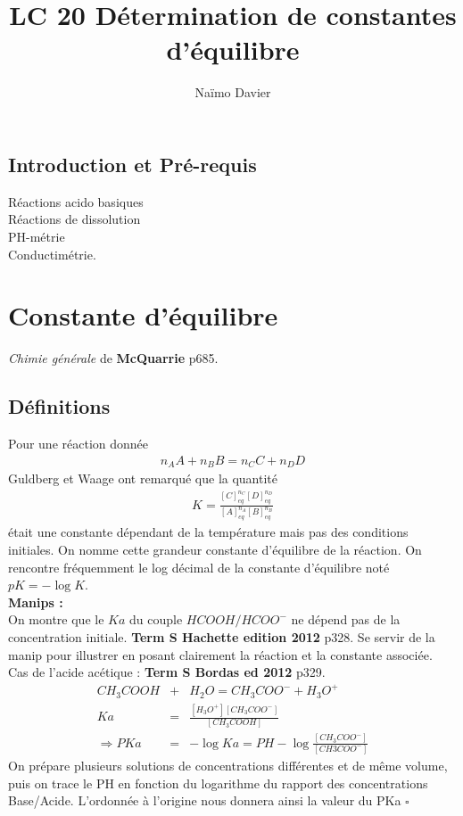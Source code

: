 \documentclass[12pt,prb,aps,epsf]{article}
\begin{document}
	
	\title{LC 20 Détermination de constantes d'équilibre}
		\author{Naïmo Davier}
	
	\maketitle
	
	\tableofcontents
	
	\pagebreak
	
\subsection{Introduction et Pré-requis}
Réactions acido basiques\\
Réactions de dissolution\\
PH-métrie\\
Conductimétrie.

\section{Constante d'équilibre}
\textit{Chimie générale} de \textbf{McQuarrie} p685.

\subsection{Définitions}
Pour une réaction donnée
\begin{eqnarray}
n_A A + n_BB = n_CC + n_DD
\end{eqnarray}
Guldberg et Waage ont remarqué que la quantité 
\begin{eqnarray}
K = \frac{[C]^{n_C}_{eq}[D]^{n_D}_{eq}}{[A]^{n_A}_{eq}[B]_{eq}^{n_B}}
\end{eqnarray} 
était une constante dépendant de la température mais pas des conditions initiales. On nomme cette grandeur constante d'équilibre de la réaction. On rencontre fréquemment le log décimal de la constante d'équilibre noté $pK = - \log K$.\\

\textbf{Manips :} \\

On montre que le $Ka$ du couple $HCOOH/HCOO^-$ ne dépend pas de la concentration initiale. \textbf{Term S Hachette edition 2012} p328. Se servir de la manip pour illustrer en posant clairement la réaction et la constante associée.\\

Cas de l'acide acétique : \textbf{Term S Bordas ed 2012} p329.\\
\begin{eqnarray}
CH_3COOH &+& H_2O = CH_3COO^- + H_3O^+\\ 
Ka &=& \frac{[H_3O^+][CH_3COO^-]}{[CH_3COOH]}\\ 
\Rightarrow PKa &=& -\log Ka =  PH - \log\frac{[CH_3COO^-]}{[CH3COO^-]}
\end{eqnarray}
On prépare plusieurs solutions de concentrations différentes et de même volume, puis on trace le PH en fonction du logarithme du rapport des concentrations Base/Acide. L'ordonnée à l'origine nous donnera ainsi la valeur du PKa $\square$\\
\end{document}
